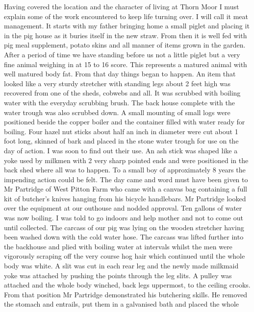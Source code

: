 
Having covered the location and the character of living at Thorn Moor I must
explain some of the work encountered to keep life turning over.  I will call it
meat management. It starts with my father bringing home a small piglet and
placing it in the pig house as it buries itself in the new straw.  From then it
is well fed with pig meal supplement, potato skins and all manner of items
grown in the garden.  After a period of time we have standing before us not a
little piglet but a very fine animal weighing in at 15 to 16 score.  This
represents a matured animal with well matured body fat.  From that day things
began to happen.  An item that looked like a very sturdy stretcher with
standing legs about 2 feet high was recovered from one of the sheds, cobwebs
and all.  It was scrubbed with boiling water with the everyday scrubbing brush.
The back house complete with the water trough was also scrubbed down.  A small
mounting of small logs were positioned beside the copper boiler and the
container filled with water ready for boiling.  Four hazel nut sticks about
half an inch in diameter were cut about 1 foot long, skinned of bark and placed
in the stone water trough for use on the day of action.  I was soon to find out
their use.  An ash stick was shaped like a yoke used by milkmen with 2 very
sharp pointed ends and were positioned in the back shed where all was to
happen.  To a small boy of approximately 8 years the impending action could be
felt. The day came and word must have been given to Mr Partridge of West Pitton
Farm who came with a canvas bag containing a full kit of butcher's knives
hanging from his bicycle handlebars.  Mr Partridge looked over the equipment at
our outhouse and nodded approval.  Ten gallons of water was now boiling.  I was
told to go indoors and help mother and not to come out until collected. The
carcass of our pig was lying on the wooden stretcher having been washed down
with the cold water hose.  The carcass was lifted further into the backhouse
and plied with boiling water at intervals whilst the men were vigorously
scraping off the very course hog hair which continued until the whole body was
white.  A slit was cut in each rear leg and the newly made milkmaid yoke was
attached by pushing the points through the leg slits.  A pulley was attached
and the whole body winched, back legs uppermost, to the ceiling crooks.  From
that position Mr Partridge demonstrated his butchering skills.  He removed the
stomach and entrails, put them in a galvanised bath and placed the whole
